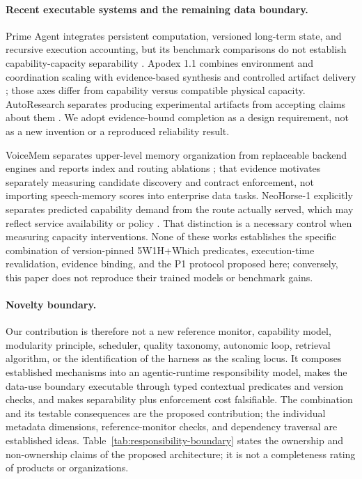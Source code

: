 \paragraph{Recent executable systems and the remaining data boundary.}
Prime Agent integrates persistent computation, versioned long-term state, and recursive execution accounting, but its benchmark comparisons do not establish capability-capacity separability \cite{karten2026prime}. Apodex 1.1 combines environment and coordination scaling with evidence-based synthesis and controlled artifact delivery \cite{apodex2026}; those axes differ from capability versus compatible physical capacity. AutoResearch separates producing experimental artifacts from accepting claims about them \cite{ren2026autoresearch}. We adopt evidence-bound completion as a design requirement, not as a new invention or a reproduced reliability result.

VoiceMem separates upper-level memory organization from replaceable backend engines and reports index and routing ablations \cite{xie2026voicemem}; that evidence motivates separately measuring candidate discovery and contract enforcement, not importing speech-memory scores into enterprise data tasks. NeoHorse-1 explicitly separates predicted capability demand from the route actually served, which may reflect service availability or policy \cite{neohorse2026}. That distinction is a necessary control when measuring capacity interventions. None of these works establishes the specific combination of version-pinned 5W1H+Which predicates, execution-time revalidation, evidence binding, and the P1 protocol proposed here; conversely, this paper does not reproduce their trained models or benchmark gains.

\paragraph{Novelty boundary.}
Our contribution is therefore not a new reference monitor, capability model, modularity principle, scheduler, quality taxonomy, autonomic loop, retrieval algorithm, or the identification of the harness as the scaling locus. It composes established mechanisms into an agentic-runtime responsibility model, makes the data-use boundary executable through typed contextual predicates and version checks, and makes separability plus enforcement cost falsifiable. The combination and its testable consequences are the proposed contribution; the individual metadata dimensions, reference-monitor checks, and dependency traversal are established ideas. Table~\ref{tab:responsibility-boundary} states the ownership and non-ownership claims of the proposed architecture; it is not a completeness rating of products or organizations.

